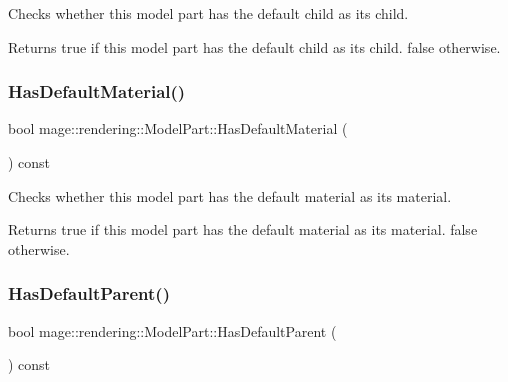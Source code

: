 Checks whether this model part has the default child as its child.

\begin{DoxyReturn}{Returns}
{\ttfamily true} if this model part has the default child as its child. {\ttfamily false} otherwise. 
\end{DoxyReturn}
\mbox{\label{structmage_1_1rendering_1_1_model_part_aae8cebe1ec39e939b53fc3f7330984a8}} 
\subsubsection{\texorpdfstring{Has\+Default\+Material()}{HasDefaultMaterial()}}
{\footnotesize\ttfamily bool mage\+::rendering\+::\+Model\+Part\+::\+Has\+Default\+Material (\begin{DoxyParamCaption}{ }\end{DoxyParamCaption}) const\hspace{0.3cm}{\ttfamily [noexcept]}}

Checks whether this model part has the default material as its material.

\begin{DoxyReturn}{Returns}
{\ttfamily true} if this model part has the default material as its material. {\ttfamily false} otherwise. 
\end{DoxyReturn}
\mbox{\label{structmage_1_1rendering_1_1_model_part_ac452d6bba03decae31646eec0329c4ab}} 
\subsubsection{\texorpdfstring{Has\+Default\+Parent()}{HasDefaultParent()}}
{\footnotesize\ttfamily bool mage\+::rendering\+::\+Model\+Part\+::\+Has\+Default\+Parent (\begin{DoxyParamCaption}{ }\end{DoxyParamCaption}) const\hspace{0.3cm}{\ttfamily [noexcept]}}

